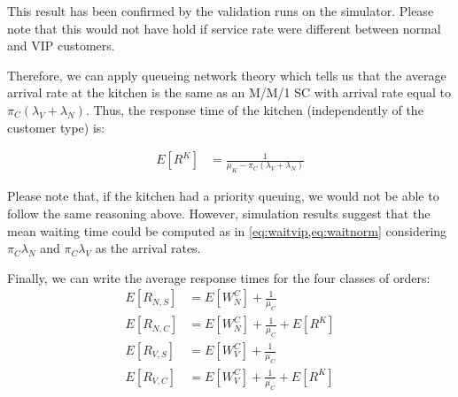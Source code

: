 This result has been confirmed by the validation runs on the simulator. 
Please note that this would not have hold if service rate were different between
normal and VIP customers.

Therefore, we can apply queueing network theory which tells us that the average 
arrival rate at the kitchen is the same as an M/M/1 SC with arrival rate equal 
to $\pi_C(\lambda_V+\lambda_N)$. Thus, the response time of the kitchen 
(independently of the customer type) is:

\begin{align}
    E[R^K] &= \frac{1}{\mu_K-\pi_C(\lambda_{V}+\lambda_{N})}
\end{align}

Please note that, if the kitchen had a priority queuing, we would not be able
to follow the same reasoning above. However, simulation results suggest that 
the mean waiting time could be computed as in \cref{eq:waitvip,eq:waitnorm}
considering $\pi_C \lambda_N$ and $\pi_C \lambda_V$ as the arrival rates.

Finally, we can write the average response times for the four classes of orders:
\begin{align}
    E[R_{N,S}] &= E[W^C_{N}] + \frac{1}{\mu_C} \\
    E[R_{N,C}] &= E[W^C_{N}] + \frac{1}{\mu_C} + E[R^K] \\
    E[R_{V,S}] &= E[W^C_{V}] + \frac{1}{\mu_C} \\
    E[R_{V,C}] &= E[W^C_{V}] + \frac{1}{\mu_C} + E[R^K]
\end{align}